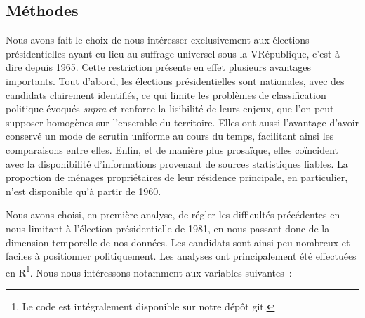 \documentclass[a4paper,14pt]{article}
\begin{document}
\begin{multicols}{2}
\section*{Méthodes}
Nous avons fait le choix de nous intéresser exclusivement aux élections présidentielles ayant eu lieu au suffrage universel sous la \textsc{V}\ieme République, c'est-à-dire depuis 1965. Cette restriction présente en effet plusieurs avantages importants. Tout d'abord, les élections présidentielles sont nationales, avec des candidats clairement identifiés, ce qui limite les problèmes de classification politique évoqués \textit{supra} et renforce la lisibilité de leurs enjeux, que l'on peut supposer homogènes sur l'ensemble du territoire. Elles ont aussi l'avantage d'avoir conservé un mode de scrutin uniforme au cours du temps, facilitant ainsi les comparaisons entre elles. Enfin, et de manière plus prosaïque, elles coïncident avec la disponibilité d'informations provenant de sources statistiques fiables. La proportion de ménages propriétaires de leur résidence principale, en particulier, n'est disponible qu'à partir de 1960. 

Nous avons choisi, en première analyse, de régler les difficultés précédentes en nous limitant à l'élection présidentielle de 1981, en nous passant donc de la dimension temporelle de nos données. Les candidats sont ainsi peu nombreux et faciles à positionner politiquement. Les analyses ont principalement été effectuées en R\footnote{Le code est intégralement disponible sur notre dépôt git.}.
\newline
Nous nous intéressons notamment aux variables suivantes~: 

\end{multicols}
\end{document}
